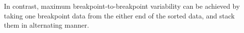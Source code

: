 In contrast, maximum breakpoint-to-breakpoint variability can be achieved by
taking one breakpoint data from the either end of the sorted data, and stack
them in alternating manner.%
%
%
%
%
%
%
%
%
%
%

